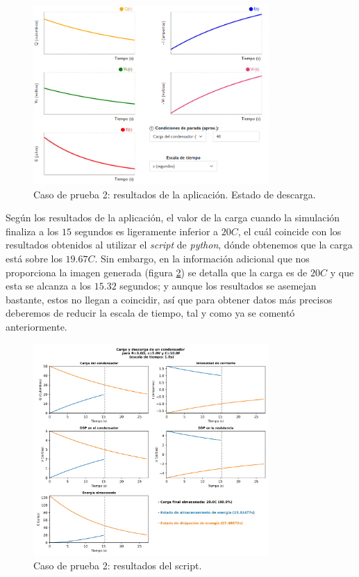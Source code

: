 \documentclass[../main.tex]{subfiles}
\begin{document}
\begin{figure}[!h]
    \centering
    \includegraphics[width=0.8\textwidth]{images/cp2.1-app.PNG}
    \caption{Caso de prueba 2: resultados de la aplicación. Estado de descarga.}
    \label{fig::cp2.1-app}
\end{figure}

Según los resultados de la aplicación, el valor de la carga cuando la simulación finaliza a los $15$ segundos es ligeramente inferior a $20C$, el cuál coincide con los resultados obtenidos al utilizar el \textit{script} de \textit{python}, dónde obtenemos que la carga está sobre los $19.67C$. Sin embargo, en la información adicional que nos proporciona la imagen generada (figura \ref{fig::cp2.1-py}) se detalla que la carga es de $20C$ y que esta se alcanza a los $15.32$ segundos; y aunque los resultados se asemejan bastante, estos no llegan a coincidir, así que para obtener datos más precisos deberemos de reducir la escala de tiempo, tal y como ya se comentó anteriormente. 

\begin{figure}[!h]
    \centering
    \includegraphics[width=0.8\textwidth]{images/cp2-py.png}
    \caption{Caso de prueba 2: resultados del script. }
    \label{fig::cp2.1-py}
\end{figure}
\end{document}
